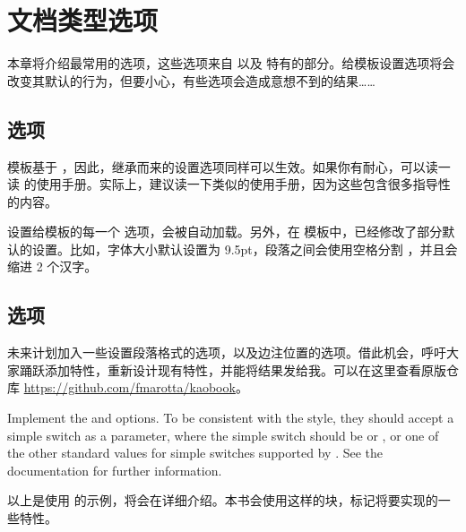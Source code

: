 \setchapterpreamble[u]{\margintoc}
\chapter{文档类型选项}

本章将介绍最常用的选项，这些选项来自  以及  特有的部分。给模板设置选项将会改变其默认的行为，但要小心，有些选项会造成意想不到的结果……

\section{ 选项}

 模板基于 ，因此，继承而来的设置选项同样可以生效。如果你有耐心，可以读一读 \KOMAScript 的使用手册。实际上，建议读一下类似的使用手册，因为这些包含很多指导性的内容。

设置给模板的每一个 \KOMAScript 选项，会被自动加载。另外，在  模板中，已经修改了部分默认的设置。比如，字体大小默认设置为 9.5pt，段落之间会使用空格分割 ，并且会缩进 2 个汉字。

\section{ 选项}

未来计划加入一些设置段落格式的选项，以及边注位置的选项。借此机会，呼吁大家踊跃添加特性，重新设计现有特性，并能将结果发给我。可以在这里查看原版仓库 \url{https://github.com/fmarotta/kaobook}。

\begin{kaobox}[frametitle=\noindent 待办]
Implement the  and  options. To be consistent with the \KOMAScript style, they should accept a simple switch as a parameter, where the simple switch should be  or , or one of the other standard values for simple switches supported by \KOMAScript. See the \KOMAScript documentation for further information.
\end{kaobox}

以上是使用  的示例，将会在详细介绍。本书会使用这样的块，标记将要实现的一些特性。

